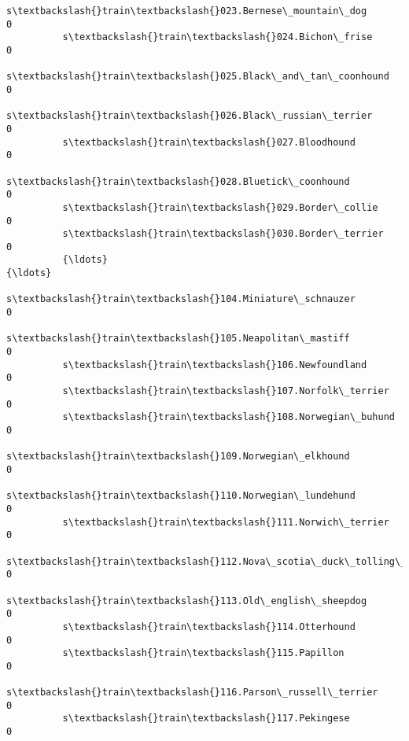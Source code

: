 \documentclass[11pt]{article}
\begin{document}
\begin{Verbatim}[commandchars=\\\{\}]
          s\textbackslash{}train\textbackslash{}023.Bernese\_mountain\_dog                                       0   
          s\textbackslash{}train\textbackslash{}024.Bichon\_frise                                               0   
          s\textbackslash{}train\textbackslash{}025.Black\_and\_tan\_coonhound                                    0   
          s\textbackslash{}train\textbackslash{}026.Black\_russian\_terrier                                      0   
          s\textbackslash{}train\textbackslash{}027.Bloodhound                                                 0   
          s\textbackslash{}train\textbackslash{}028.Bluetick\_coonhound                                         0   
          s\textbackslash{}train\textbackslash{}029.Border\_collie                                              0   
          s\textbackslash{}train\textbackslash{}030.Border\_terrier                                             0   
          {\ldots}                                                                  {\ldots}   
          s\textbackslash{}train\textbackslash{}104.Miniature\_schnauzer                                        0   
          s\textbackslash{}train\textbackslash{}105.Neapolitan\_mastiff                                         0   
          s\textbackslash{}train\textbackslash{}106.Newfoundland                                               0   
          s\textbackslash{}train\textbackslash{}107.Norfolk\_terrier                                            0   
          s\textbackslash{}train\textbackslash{}108.Norwegian\_buhund                                           0   
          s\textbackslash{}train\textbackslash{}109.Norwegian\_elkhound                                         0   
          s\textbackslash{}train\textbackslash{}110.Norwegian\_lundehund                                        0   
          s\textbackslash{}train\textbackslash{}111.Norwich\_terrier                                            0   
          s\textbackslash{}train\textbackslash{}112.Nova\_scotia\_duck\_tolling\_retriever                         0   
          s\textbackslash{}train\textbackslash{}113.Old\_english\_sheepdog                                       0   
          s\textbackslash{}train\textbackslash{}114.Otterhound                                                 0   
          s\textbackslash{}train\textbackslash{}115.Papillon                                                   0   
          s\textbackslash{}train\textbackslash{}116.Parson\_russell\_terrier                                     0   
          s\textbackslash{}train\textbackslash{}117.Pekingese                                                  0   

\end{Verbatim}
\end{document}
